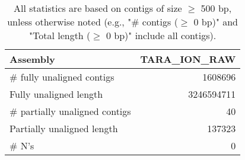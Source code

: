 \documentclass[12pt,a4paper]{article}
\begin{document}
\begin{table}[ht]
\begin{center}
\caption{All statistics are based on contigs of size $\geq$ 500 bp, unless otherwise noted (e.g., "\# contigs ($\geq$ 0 bp)" and "Total length ($\geq$ 0 bp)" include all contigs).}
\begin{tabular}{|l*{1}{|r}|}
\hline
Assembly & TARA\_ION\_RAW \\ \hline
\# fully unaligned contigs & 1608696 \\ \hline
Fully unaligned length & 3246594711 \\ \hline
\# partially unaligned contigs & 40 \\ \hline
Partially unaligned length & 137323 \\ \hline
\# N's & 0 \\ \hline
\end{tabular}
\end{center}
\end{table}
\end{document}
